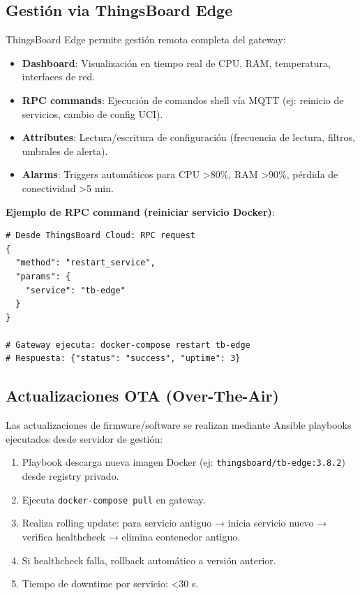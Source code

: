 \subsection{Gestión via ThingsBoard Edge}

ThingsBoard Edge permite gestión remota completa del gateway:

\begin{itemize}
    \item \textbf{Dashboard}: Visualización en tiempo real de CPU, RAM, temperatura, interfaces de red.
    \item \textbf{RPC commands}: Ejecución de comandos shell vía MQTT (ej: reinicio de servicios, cambio de config UCI).
    \item \textbf{Attributes}: Lectura/escritura de configuración (frecuencia de lectura, filtros, umbrales de alerta).
    \item \textbf{Alarms}: Triggers automáticos para CPU >80\%, RAM >90\%, pérdida de conectividad >5 min.
\end{itemize}

\textbf{Ejemplo de RPC command (reiniciar servicio Docker)}:

\begin{verbatim}
# Desde ThingsBoard Cloud: RPC request
{
  "method": "restart_service",
  "params": {
    "service": "tb-edge"
  }
}

# Gateway ejecuta: docker-compose restart tb-edge
# Respuesta: {"status": "success", "uptime": 3}
\end{verbatim}

\subsection{Actualizaciones OTA (Over-The-Air)}

Las actualizaciones de firmware/software se realizan mediante Ansible playbooks ejecutados desde servidor de gestión:

\begin{enumerate}
    \item Playbook descarga nueva imagen Docker (ej: \texttt{thingsboard/tb-edge:3.8.2}) desde registry privado.
    \item Ejecuta \texttt{docker-compose pull} en gateway.
    \item Realiza rolling update: para servicio antiguo → inicia servicio nuevo → verifica healthcheck → elimina contenedor antiguo.
    \item Si healthcheck falla, rollback automático a versión anterior.
    \item Tiempo de downtime por servicio: <30 s.
\end{enumerate}

